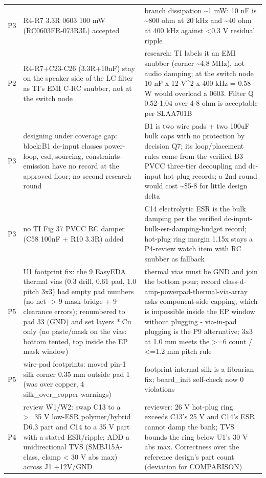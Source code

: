 \documentclass[11pt,a4paper]{article}
\begin{document}
{\begin{longtable}{lp{5.2cm}p{7.2cm}}
P3 & R4-R7 3.3R 0603 100 mW (RC0603FR-073R3L) accepted & branch dissipation \textasciitilde{}1 mW: 10 nF is \textasciitilde{}800 ohm at 20 kHz and \textasciitilde{}40 ohm at 400 kHz against \textless{}0.3 V residual ripple \\
P2 & R4-R7+C23-C26 (3.3R+10nF) stay on the speaker side of the LC filter as TI's EMI C-RC snubber, not at the switch node & research: TI labels it an EMI snubber (corner \textasciitilde{}4.8 MHz), not audio damping; at the switch node 10 nF x 12 V\textasciicircum{}2 x 400 kHz = 0.58 W would overload a 0603. Filter Q 0.52-1.04 over 4-8 ohm is acceptable per SLAA701B \\
P3 & designing under coverage gap: block:B1 dc-input classes power-loop, esd, sourcing, constraints-emission have no record at the approved floor; no second research round & B1 is two wire pads + two 100uF bulk caps with no protection by decision Q7; its loop/placement rules come from the verified B3 PVCC three-tier decoupling and dc-input hot-plug records; a 2nd round would cost \textasciitilde{}\$5-8 for little design delta \\
P3 & no TI Fig 37 PVCC RC damper (C58 100nF + R10 3.3R) added & C14 electrolytic ESR is the bulk damping per the verified dc-input-bulk-esr-damping-budget record; hot-plug ring margin 1.15x stays a P4-review watch item with RC snubber as fallback \\
P5 & U1 footprint fix: the 9 EasyEDA thermal vias (0.3 drill, 0.61 pad, 1.0 pitch 3x3) had empty pad numbers (no net -\textgreater{} 9 mask-bridge + 9 clearance errors); renumbered to pad 33 (GND) and set layers {*}.Cu only (no paste/mask on the vias: bottom tented, top inside the EP mask window) & thermal vias must be GND and join the bottom pour; record class-d-amp-powerpad-thermal-via-array asks component-side capping, which is impossible inside the EP window without plugging - via-in-pad plugging is the P9 alternative; 3x3 at 1.0 mm meets the \textgreater{}=6 count / \textless{}=1.2 mm pitch rule \\
P5 & wire-pad footprints: moved pin-1 silk corner 0.35 mm outside pad 1 (was over copper, 4 silk\_over\_copper warnings) & footprint-internal silk is a librarian fix; board\_init self-check now 0 violations \\
P4 & review W1/W2: swap C13 to a \textgreater{}=35 V low-ESR polymer/hybrid D6.3 part and C14 to a 35 V part with a stated ESR/ripple; ADD a unidirectional TVS (SMBJ15A-class, clamp \textless{} 30 V abs max) across J1 +12V/GND & reviewer: 26 V hot-plug ring exceeds C13's 25 V and C14's ESR cannot damp the bank; TVS bounds the ring below U1's 30 V abs max. Correctness over the reference design's part count (deviation for COMPARISON) \\

\end{longtable}}
\end{document}
